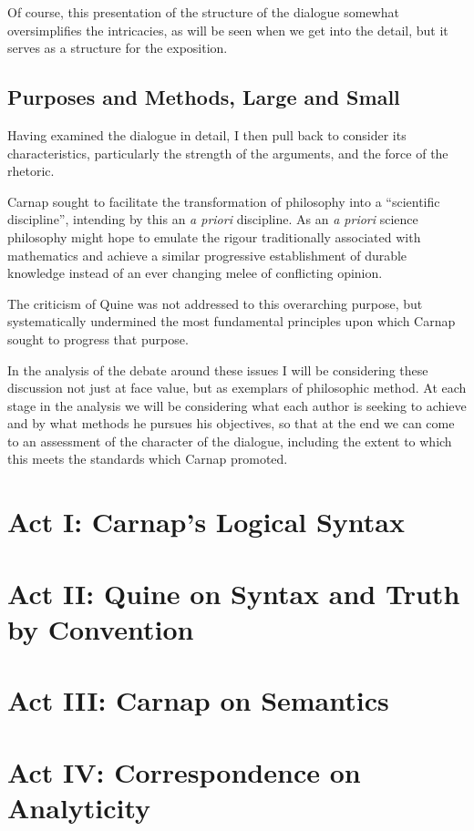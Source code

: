 Of course, this presentation of the structure of the dialogue somewhat oversimplifies
the intricacies, as will be seen when we get into the detail, but it serves
as a structure for the exposition.

\subsection{Purposes and Methods, Large and Small}

Having examined the dialogue in detail, I then pull back to consider its characteristics,
particularly the strength of the arguments, and the force of the rhetoric.

Carnap sought to facilitate the transformation of philosophy into a ``scientific discipline'', intending by this an \emph{a priori} discipline.
As an \emph{a priori} science philosophy might hope to emulate the rigour traditionally associated with mathematics and achieve a similar progressive establishment of durable knowledge instead of an ever changing melee of conflicting opinion.

The criticism of Quine was not addressed to this overarching purpose, but systematically undermined the most fundamental principles upon which Carnap sought to progress that purpose.

In the analysis of the debate around these issues I will be considering these discussion not just at face value, but as exemplars of philosophic method.
At each stage in the analysis we will be considering what each author is seeking to achieve and by what methods he pursues his objectives, so that at the end we can come to an assessment of the character of the dialogue, including the extent to which this meets the standards which Carnap promoted.


\section{Act I: Carnap's Logical Syntax}

\section{Act II: Quine on Syntax and Truth by Convention}

\section{Act III: Carnap on Semantics}

\section{Act IV: Correspondence on Analyticity}

